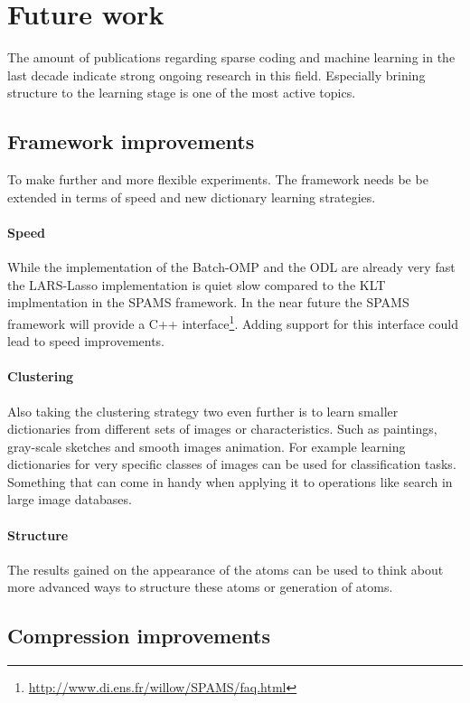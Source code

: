 \section{Future work}
The amount of publications regarding sparse coding and machine learning in the
last decade indicate strong ongoing research in this field. Especially
brining structure to the learning stage is one of the most active topics.

\subsection{Framework improvements}
To make further and more flexible experiments. The framework needs be be
extended in terms of speed and new dictionary learning strategies.

\paragraph{Speed}
While the implementation of the Batch-OMP and the ODL are already very fast
the LARS-Lasso implementation is quiet slow compared to the KLT implmentation in
the SPAMS framework. In the near future the SPAMS framework will provide a C++
interface\footnote{\url{http://www.di.ens.fr/willow/SPAMS/faq.html}}. Adding
support for this interface could lead to speed improvements.

\paragraph{Clustering}
Also taking the clustering strategy two even further is to learn smaller
dictionaries from different sets of images or characteristics. Such as
paintings, gray-scale sketches and smooth images animation. For example learning
dictionaries for very specific classes of images can be used for classification
tasks. Something that can come in handy when applying it to operations like
search in large image databases.

\paragraph{Structure}
The results gained on the appearance of the atoms can be used to think
about more advanced ways to structure these atoms or generation of atoms.
 

\subsection{Compression improvements}


